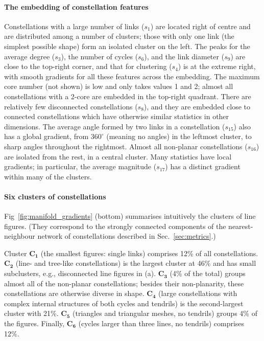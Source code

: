 \documentclass[10pt]{article}
\begin{document}
\paragraph{The embedding of constellation features} Constellations with a large number of links ($s_1$) are located right of centre and are distributed among a number of clusters; those with only one link (the simplest possible shape) form an isolated cluster on the left. The peaks for the average degree ($s_3$), the number of cycles ($s_6$), and the link diameter ($s_9$) are close to the top-right corner, and that for clustering ($s_4$) is at the extreme right, with smooth gradients for all these features across the embedding. The maximum core number (not shown) is low and only takes values 1 and 2; almost all constellations with a 2-core are embedded in the top-right quadrant. There are relatively few disconnected constellations ($s_8$), and they are embedded close to connected constellations which have otherwise similar statistics in other dimensions. The average angle formed by two links in a constellation ($s_{15}$) also has a global gradient, from $360^{\circ}$ (meaning no angles) in the leftmost cluster, to sharp angles throughout the rightmost. Almost all non-planar constellations ($s_{16}$) are isolated from the rest, in a central cluster. Many statistics have local gradients; in particular, the average magnitude ($s_{17}$) has a distinct gradient within many of the clusters.

\paragraph{Six clusters of constellations} Fig~\ref{fig:manifold_gradients} (bottom) summarises intuitively the clusters of line figures. (They correspond to the strongly connected components of the nearest-neighbour network of constellations described in Sec.~\ref{sec:metrics}.)

Cluster $\mathbf{C_1}$ (the smallest figures: single links) comprises 12\% of all constellations. $\mathbf{C_2}$ (line- and tree-like constellations) is the largest cluster at 46\% and has small subclusters, e.g., disconnected line figures in (a). $\mathbf{C_3}$ (4\% of the total) groups almost all of the non-planar constellations; besides their non-planarity, these constellations are otherwise diverse in shape. $\mathbf{C_4}$ (large constellations with complex internal structures of both cycles and tendrils) is the second-largest cluster with 21\%. $\mathbf{C_5}$ (triangles and triangular meshes, no tendrils) groups 4\% of the figures. Finally, $\mathbf{C_6}$ (cycles larger than three lines, no tendrils) comprises 12\%.
\end{document}
